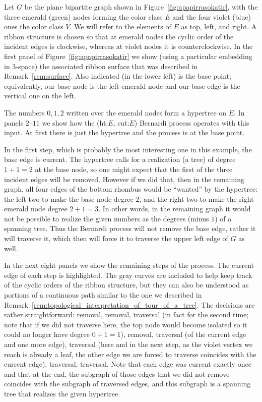 \documentclass[ALCO,ThmDefs,Unicode,epreuves]{cedram}
\begin{document}
\begin{exam}
\label{ex:apapirrasokatir}
Let $G$ be the plane bipartite graph shown in Figure~\ref{fig:apapirrasokatir}, with the three emerald (green) nodes forming the color class $E$ and the four violet (blue) ones the color class $V$. We will refer to the elements of $E$ as top, left, and right. A ribbon structure is chosen so that at emerald nodes the cyclic order of the incident edges is clockwise, whereas at violet nodes it is counterclockwise. In the first panel of Figure~\ref{fig:apapirrasokatir} we show (using a particular embedding in $3$-space) the associated ribbon surface that was described in Remark~\ref{rem:surface}. Also indicated (in the lower left) is the base point; equivalently, our base node is the left emerald node and our base edge is the vertical one on the left.

The numbers $0,1,2$ written over the emerald nodes form a hypertree on $E$. In panels $2$--$11$ we show how the (ht:$E$, cut:$E$) Bernardi process operates with this input. At first there is just the hypertree and the process is at the base point. 

In the first step, which is probably the most interesting one in this example, the base edge is current. The hypertree calls for a realization (a tree) of degree $1+1=2$ at the base node, so one might expect that the first of the three incident edges will be removed. However if we did that, then in the remaining graph, all four edges of the bottom rhombus would be ``wanted'' by the hypertree: the left two to make the base node degree $2$, and the right two to make the right emerald node degree $2+1=3$. In other words, in the remaining graph it would not be possible to realize the given numbers as the degrees (minus $1$) of a spanning tree. Thus the Bernardi process will not remove the base edge, rather it will traverse it, which then will force it to traverse the upper left edge of $G$ as well.

In the next eight panels we show the remaining steps of the process. The current edge of each step is highlighted. The gray curves are included to help keep track of the cyclic orders of the ribbon structure, but they can also be understood as portions of a continuous path similar to the one we described in Remark~\ref{rem:topological_interpretation_of_tour_of_a_tree}. The decisions are rather straightforward: removal, removal, traversal (in fact for the second time; note that if we did not traverse here, the top node would become isolated so it could no longer have degree $0+1=1$), removal, traversal (of the current edge and one more edge), traversal (here and in the next step, as the violet vertex we reach is already a leaf, the other edge we are forced to traverse coincides with the current edge), traversal, traversal. Note that each edge was current exactly once and that at the end, the subgraph of those edges that we did not remove coincides with the subgraph of traversed edges, and this subgraph is a spanning tree that realizes the given hypertree.


\end{exam}
\end{document}
